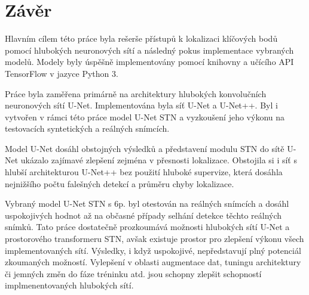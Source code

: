 \chapter{Závěr}
\label{sec:Chapter7}
Hlavním cílem této práce byla rešerše přístupů k lokalizaci klíčových bodů pomocí hlubokých neuronových sítí a následný pokus implementace vybraných modelů. Modely byly úspěšně implementovány pomocí knihovny a učícího API TensorFlow v jazyce Python 3.

Práce byla zaměřena primárně na architektury hlubokých konvolučních neuronových sítí U-Net. Implementována byla síť U-Net a U-Net++. Byl i vytvořen v rámci této práce model U-Net STN a vyzkoušení jeho výkonu na testovacích syntetických a reálných snímcích.

Model U-Net dosáhl obstojných výsledků a představení modulu STN do sítě U-Net ukázalo zajímavé zlepšení zejména v přesnosti lokalizace. Obstojila si i síť s hlubší architekturou U-Net++ bez použití hluboké supervize, která dosáhla nejnižšího počtu falešných detekcí a průměru chyby lokalizace.

Vybraný model U-Net STN s 6p. byl otestován na reálných snímcích a dosáhl uspokojivých hodnot až na občasné případy selhání detekce těchto reálných snímků. Tato práce dostatečně prozkoumává možnosti hlubokých sítí U-Net a prostorového transformeru STN, avšak existuje prostor pro zlepšení výkonu všech implementovaných sítí. Výsledky, i když uspokojivé, nepředstavují plný potenciál zkoumaných možností. Vylepšení v oblasti augmentace dat, tuningu architektury či jemných změn do fáze tréninku atd. jsou schopny zlepšit schopností implmenentovaných hlubokých sítí. 
\endinput